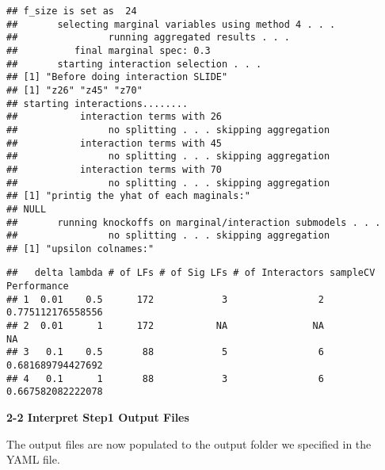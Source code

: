 \documentclass[
]{article}
\begin{document}
\begin{verbatim}
## f_size is set as  24 
##       selecting marginal variables using method 4 . . . 
##                running aggregated results . . . 
##          final marginal spec: 0.3
##       starting interaction selection . . . 
## [1] "Before doing interaction SLIDE"
## [1] "z26" "z45" "z70"
## starting interactions........ 
##           interaction terms with 26 
##                no splitting . . . skipping aggregation 
##           interaction terms with 45 
##                no splitting . . . skipping aggregation 
##           interaction terms with 70 
##                no splitting . . . skipping aggregation 
## [1] "printig the yhat of each maginals:"
## NULL
##       running knockoffs on marginal/interaction submodels . . . 
##                no splitting . . . skipping aggregation 
## [1] "upsilon colnames:"
\end{verbatim}

\begin{verbatim}
##   delta lambda # of LFs # of Sig LFs # of Interactors sampleCV Performance
## 1  0.01    0.5      172            3                2    0.775112176558556
## 2  0.01      1      172           NA               NA                   NA
## 3   0.1    0.5       88            5                6    0.681689794427692
## 4   0.1      1       88            3                6    0.667582082222078
\end{verbatim}

\textbf{2-2 Interpret Step1 Output Files}

The output files are now populated to the output folder we specified in
the YAML file.
\end{document}
